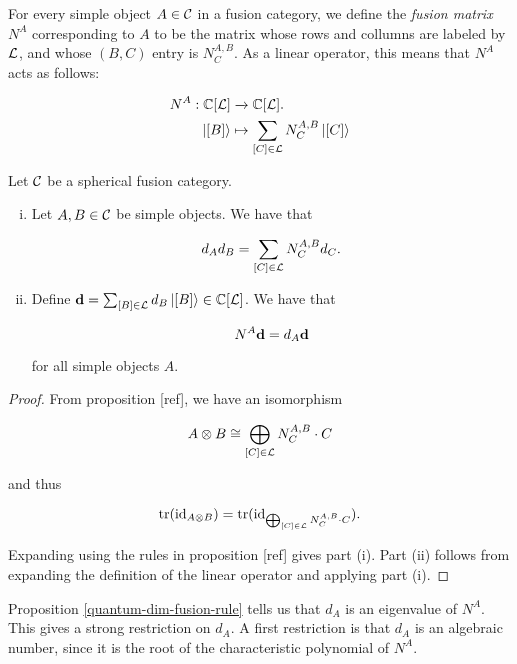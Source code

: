 \begin{defn} For every simple object $A\in {\mathcal C}$ in a fusion category, we define the {\em fusion matrix} $N^{A}$ corresponding to $A$ to be the matrix whose rows and collumns are labeled by ${\mathcal L}$, and whose $(B,C)$ entry is $N^{A,B}_{C}$. As a linear operator, this means that $N^{A}$ acts as follows:

 \begin{align*}
N^{A}:{\mathbb C}[{\mathcal L}]&\xrightarrow{} {\mathbb C}[{\mathcal L}].\\
\ket{[B]}&\mapsto \sum_{[C]\in {\mathcal L}} N^{A,B}_C \ket{[C]}
\end{align*}
\end{defn}

\begin{prop}\label{quantum-dim-fusion-rule} Let ${\mathcal C}$ be a spherical fusion category.

\begin{enumerate}[(i)]
\item Let $A,B\in {\mathcal C}$ be simple objects. We have that

$$d_Ad_B=\sum_{[C]\in {\mathcal L}}N^{A,B}_C d_C.$$

\item Define $\bold{d} = \sum_{[B]\in {\mathcal L}} d_{B}\ket{[B]}\in {\mathbb C}[{\mathcal L}]$. We have that

$$N^{A}\bold{d}=d_{A}\bold{d}$$

for all simple objects $A$.

\end{enumerate}

\end{prop}
\begin{proof} From proposition [ref], we have an isomorphism

$$A\otimes B \cong \bigoplus_{[C]\in {\mathcal L}}N^{A,B}_{C}\cdot C$$

and thus

$$\operatorname{tr}(\operatorname{id}_{A\otimes B})=\operatorname{tr}(\operatorname{id}_{\bigoplus_{[C]\in {\mathcal L}}N^{A,B}_{C}\cdot C}).$$

Expanding using the rules in proposition [ref] gives part (i). Part (ii) follows from expanding the definition of the linear operator and applying part (i).
\end{proof}

\begin{rem}
Proposition \ref{quantum-dim-fusion-rule} tells us that $d_A$ is an eigenvalue of $N^A$. This gives a strong restriction on $d_A$. A first restriction is that $d_A$ is an algebraic number, since it is the root of the characteristic polynomial of $N^A$.
\end{rem}

